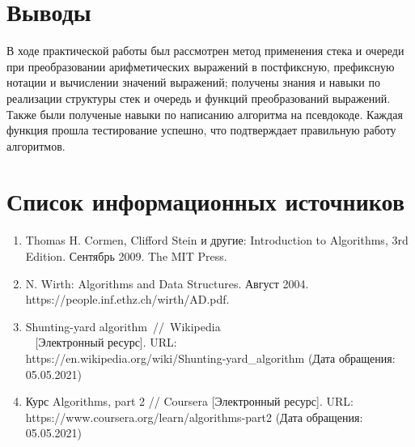 \documentclass[a4paper, 14pt]{extarticle}
\begin{document}
\section*{Выводы}
В ходе практической работы был рассмотрен метод применения стека и очереди при
преобразовании арифметических выражений в постфиксную, префиксную
нотации и вычислении значений выражений; получены знания и навыки по
реализации структуры стек и очередь и функций преобразований выражений.
Также были полученые навыки по написанию алгоритма на псевдокоде.
Каждая функция прошла тестирование успешно, что подтверждает правильную
работу алгоритмов.
\section*{Список информационных источников}
\begin{enumerate}[leftmargin=*]
  \item Thomas H. Cormen, Clifford Stein и другие: Introduction to Algorithms, 3rd Edition.
    Сентябрь 2009. The MIT Press.
  \item N. Wirth: Algorithms and Data Structures. Август 2004.
    \\ https://people.inf.ethz.ch/wirth/AD.pdf.
  \item Shunting-yard algorithm~//~Wikipedia \\~
    [Электронный ресурс]. URL:
    \\ https://en.wikipedia.org/wiki/Shunting-yard\_algorithm
    (Дата обращения: 05.05.2021)
   \item Курс Algorithms, part 2 // Coursera [Электронный ресурс]. URL:
     \\ https://www.coursera.org/learn/algorithms-part2
     (Дата обращения: 05.05.2021)
\end{enumerate}
\end{document}
